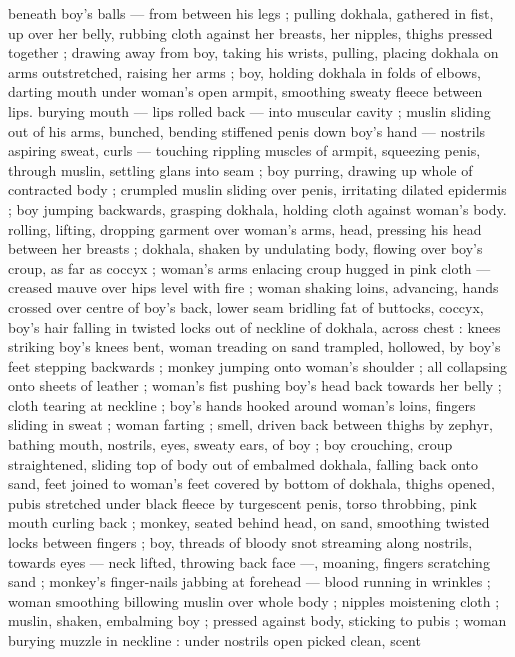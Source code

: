 beneath boy's balls --- from between his legs ; pulling dokhala, 
gathered in fist, up over her belly, rubbing cloth against her breasts, 
her nipples, thighs pressed together ; drawing away from boy, taking 
his wrists, pulling, placing dokhala on arms outstretched, raising her 
arms ; boy, holding dokhala in folds of elbows, darting mouth under 
woman's open armpit, smoothing sweaty fleece between lips. 
burying mouth --- lips rolled back --- into muscular cavity ; muslin 
sliding out of his arms, bunched, bending stiffened penis down boy's 
hand --- nostrils aspiring sweat, curls --- touching rippling muscles 
of armpit, squeezing penis, through muslin, settling glans into seam 
; boy purring, drawing up whole of contracted body ; crumpled 
muslin sliding over penis, irritating dilated epidermis ; boy jumping 
backwards, grasping dokhala, holding cloth against woman's body. 
rolling, lifting, dropping garment over woman's arms, head, pressing 
his head between her breasts ; dokhala, shaken by undulating body, 
flowing over boy's croup, as far as coccyx ; woman's arms enlacing 
croup hugged in pink cloth --- creased mauve over hips level with fire 
; woman shaking loins, advancing, hands crossed over centre of 
boy's back, lower seam bridling fat of buttocks, coccyx, boy's hair 
falling in twisted locks out of neckline of dokhala, across chest : 
knees striking boy's knees bent, woman treading on sand trampled, 
hollowed, by boy's feet stepping backwards ; monkey jumping onto 
woman's shoulder ; all collapsing onto sheets of leather ; woman's 
fist pushing boy's head back towards her belly ; cloth tearing at 
neckline ; boy's hands hooked around woman's loins, fingers sliding 
in sweat ; woman farting ; smell, driven back between thighs by 
zephyr, bathing mouth, nostrils, eyes, sweaty ears, of boy ; boy 
crouching, croup straightened, sliding top of body out of embalmed 
dokhala, falling back onto sand, feet joined to woman's feet covered 
by bottom of dokhala, thighs opened, pubis stretched under black 
fleece by turgescent penis, torso throbbing, pink mouth curling back 
; monkey, seated behind head, on sand, smoothing twisted locks 
between fingers ; boy, threads of bloody snot streaming along 
nostrils, towards eyes --- neck lifted, throwing back face ---, 
moaning, fingers scratching sand ; monkey's finger-nails jabbing at 
forehead --- blood running in wrinkles ; woman smoothing billowing 
muslin over whole body ; nipples moistening cloth ; muslin, shaken, 
embalming boy ; pressed against body, sticking to pubis ; woman 
burying muzzle in neckline : under nostrils open picked clean, scent 
